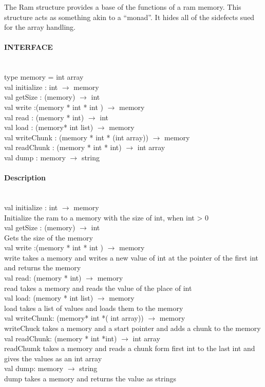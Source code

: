 \documentclass{article}
\begin{document}
The Ram structure provides a base of the functions of a ram memory. This
structure acts as something akin to a ``monad''. It hides all of the sidefects
sued for the array handling.

\paragraph{INTERFACE} \ 
\\
    type memory = int array
	\\val initialize : int $\rightarrow$ memory 							
 	\\val getSize : (memory) $\rightarrow$ int 
    \\val write :(memory * int * int ) $\rightarrow$ memory	  				
	\\val read : (memory * int) $\rightarrow$ int							
	\\val load : (memory* int list) $\rightarrow$ memory					
	\\val writeChunk : (memory * int * (int array)) $\rightarrow$ memory
	\\val readChunk : (memory * int * int) $\rightarrow$ int array			
	\\val dump : memory $\rightarrow$ string
\paragraph{Description} \
\\
val initialize : int $\rightarrow$ memory \\	
	Initialize the ram to a memory with the size of int, when int > 0
\\
val getSize : (memory) $\rightarrow$ int\\
		Gets the size of the memory
\\
val write :(memory * int * int ) $\rightarrow$ memory\\
		write takes a memory and writes a new value of int at the pointer of the first
		int and returns the memory
\\
val read: (memory * int) $\rightarrow$ memory\\
		read takes a memory and reads the value of the place of int
\\
val load: (memory * int list) $\rightarrow$ memory\\
		load takes a list of values and loads them to the memory
\\
val writeChunk: (memory* int *( int array)) $\rightarrow$ memory \\
		writeChuck takes a memory and a start pointer and adds a chunk to the memory
\\
val readChunk: (memory * int *int) $\rightarrow$ int array \\
		readChumk takes a memory and reads a chunk form first int to the last int and gives the values as an int array
\\
val dump: memory $\rightarrow$ string\\
		dump takes a memory and returns the value as strings
\end{document}
